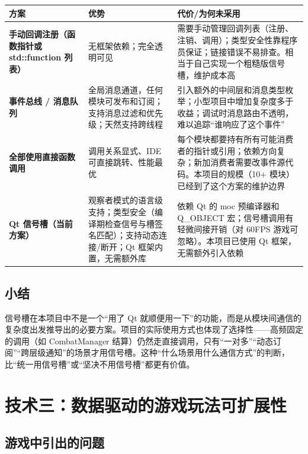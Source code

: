 \documentclass[utf8]{ctexart}
\begin{document}
\begin{longtable}{p{}p{}p{}}
\toprule
\textbf{方案} & \textbf{优势} & \textbf{代价/为何未采用} \\
\midrule
\textbf{手动回调注册（函数指针或 std::function 列表）} & 无框架依赖；完全透明可见 & 需要手动管理回调列表（注册、注销、调用）；类型安全性靠程序员保证；链接错误不易排查。相当于自己实现一个粗糙版信号槽，维护成本高 \\
\hline
\textbf{事件总线 / 消息队列} & 全局消息通道，任何模块可发布和订阅；支持消息过滤和优先级；天然支持跨线程 & 引入额外的中间层和消息类型枚举；小型项目中增加复杂度多于收益；调试时消息路由不透明，难以追踪“谁响应了这个事件” \\
\hline
\textbf{全部使用直接函数调用} & 调用关系显式、IDE 可直接跳转、性能最优 & 每个模块都要持有所有可能消费者的指针或引用；依赖方向复杂；新加消费者需要改事件源代码。本项目的规模（10+ 模块）已经到了这个方案的维护边界 \\
\hline
\textbf{Qt 信号槽（当前方案）} & 观察者模式的语言级支持；类型安全（编译期检查信号与槽签名匹配）；支持动态连接/断开；Qt 框架内置，无需额外库 & 依赖 Qt 的 moc 预编译器和 Q\_OBJECT 宏；信号槽调用有轻微间接开销（对 60FPS 游戏可忽略）。本项目已使用 Qt 框架，无需额外引入依赖 \\
\bottomrule
\end{longtable}

\subsection{小结}

信号槽在本项目中不是一个“用了 Qt 就顺便用一下”的功能，而是从模块间通信的复杂度出发推导出的必要方案。项目的实际使用方式也体现了选择性——高频固定的调用（如 CombatManager 结算）仍然走直接调用，只有“一对多”“动态订阅”“跨层级通知”的场景才用信号槽。这种“什么场景用什么通信方式”的判断，比“统一用信号槽”或“坚决不用信号槽”都更有价值。

\newpage

\section{技术三：数据驱动的游戏玩法可扩展性}

\subsection{游戏中引出的问题}
\end{document}

